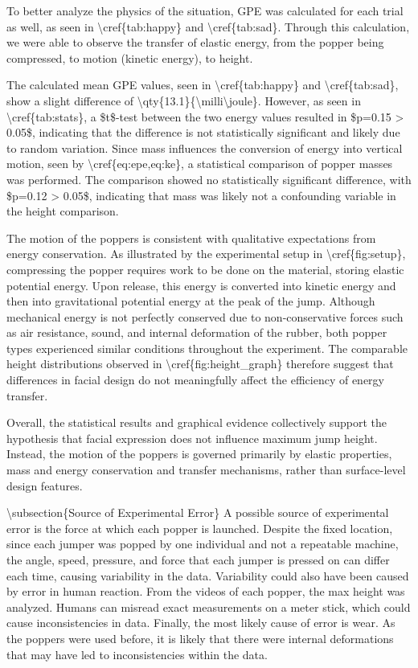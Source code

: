 To better analyze the physics of the situation, GPE was calculated for
each trial as well, as seen in \textbackslash cref\{tab:happy\} and
\textbackslash cref\{tab:sad\}. Through this calculation, we were able
to observe the transfer of elastic energy, from the popper being
compressed, to motion (kinetic energy), to height.

The calculated mean GPE values, seen in \textbackslash cref\{tab:happy\}
and \textbackslash cref\{tab:sad\}, show a slight difference of
\textbackslash qty\{13.1\}\{\textbackslash milli\textbackslash joule\}.
However, as seen in \textbackslash cref\{tab:stats\}, a \$t\$-test
between the two energy values resulted in \$p=0.15 \textgreater{}
0.05\$, indicating that the difference is not statistically significant
and likely due to random variation. Since mass influences the conversion
of energy into vertical motion, seen by
\textbackslash cref\{eq:epe,eq:ke\}, a statistical comparison of popper
masses was performed. The comparison showed no statistically significant
difference, with \$p=0.12 \textgreater{} 0.05\$, indicating that mass
was likely not a confounding variable in the height comparison.

The motion of the poppers is consistent with qualitative expectations
from energy conservation. As illustrated by the experimental setup in
\textbackslash cref\{fig:setup\}, compressing the popper requires work
to be done on the material, storing elastic potential energy. Upon
release, this energy is converted into kinetic energy and then into
gravitational potential energy at the peak of the jump. Although
mechanical energy is not perfectly conserved due to non-conservative
forces such as air resistance, sound, and internal deformation of the
rubber, both popper types experienced similar conditions throughout the
experiment. The comparable height distributions observed in
\textbackslash cref\{fig:height\_graph\} therefore suggest that
differences in facial design do not meaningfully affect the efficiency
of energy transfer.

Overall, the statistical results and graphical evidence collectively
support the hypothesis that facial expression does not influence maximum
jump height. Instead, the motion of the poppers is governed primarily by
elastic properties, mass and energy conservation and transfer
mechanisms, rather than surface-level design features.

\textbackslash subsection\{Source of Experimental Error\} A possible
source of experimental error is the force at which each popper is
launched. Despite the fixed location, since each jumper was popped by
one individual and not a repeatable machine, the angle, speed, pressure,
and force that each jumper is pressed on can differ each time, causing
variability in the data. Variability could also have been caused by
error in human reaction. From the videos of each popper, the max height
was analyzed. Humans can misread exact measurements on a meter stick,
which could cause inconsistencies in data. Finally, the most likely
cause of error is wear. As the poppers were used before, it is likely
that there were internal deformations that may have led to
inconsistencies within the data.

